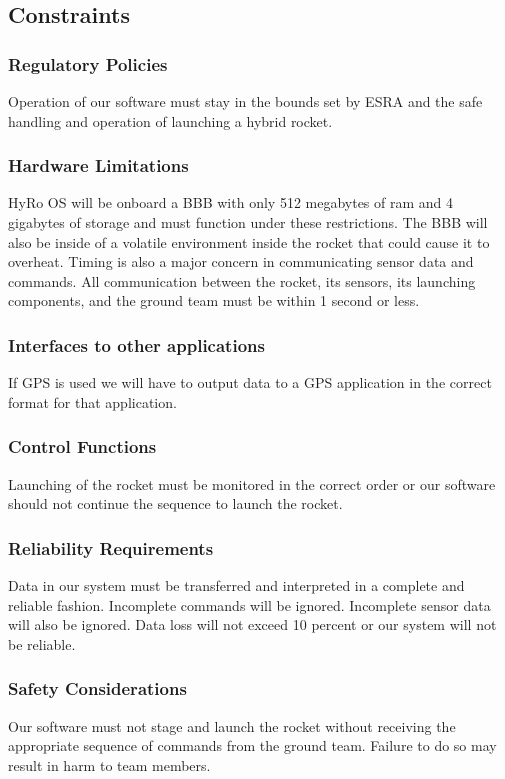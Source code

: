 \documentclass[10pt,draftclsnofoot,onecolumn,compsoc]{IEEEtran}
\begin{document}
\subsection{Constraints}

\subsubsection{\bf  Regulatory Policies}Operation of our software must stay in the bounds set by ESRA and the safe handling and operation of launching a hybrid rocket.  

\subsubsection{\bf Hardware Limitations} HyRo OS will be onboard a BBB with only 512 megabytes of ram and 4 gigabytes of storage and must function under these restrictions. The BBB will also be inside of a volatile environment inside the rocket that could cause it to overheat. Timing is also a major concern in communicating sensor data and commands. All communication between the rocket, its sensors, its launching components, and the ground team must be within 1  second or less.

\subsubsection{\bf  Interfaces to other applications} If GPS is used we will have to output data to a GPS application in the correct format for that application.
\subsubsection{\bf Control Functions} Launching of the rocket must be monitored in the correct order or our software should not continue the sequence to launch the rocket.
\subsubsection{\bf Reliability Requirements} Data in our system must be transferred and interpreted in a complete and reliable fashion. Incomplete commands will be ignored. Incomplete sensor data will also be ignored. Data loss will not exceed 10 percent or our system will not be reliable.
\subsubsection{\bf Safety Considerations} Our software must not stage and launch the rocket without receiving the appropriate sequence of commands from the ground team. Failure to do so may result in harm to team members.
\end{document}
